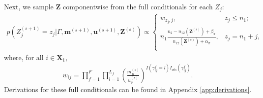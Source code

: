 \documentclass[ba]{imsart}
\begin{document}
Next, we sample $\bm{Z}$ componentwise from the full conditionals for each $Z_j$:
\begin{align}
\label{eqn:z_full_conditional}
p\left(Z_j^{(s+1)}  = z_j|\Gamma, \bm{m}^{(s+1)}, \bm{u}^{(s+1)}, \bm{Z^{(s)}}\right) \propto
\begin{cases} 
	w_{z_j, j},  & z_j \leq n_1; \\
	n_1 \frac{n_2 - n_{12}(\bm{Z}^{(s)}) + \beta_{\pi}}{n_{12}(\bm{Z}^{(s)}) + \alpha_{\pi}}, & z_j  = n_1 + j, \\
\end{cases}
\end{align}
where, for all $i \in \bm{X}_1$, 
\begin{align}
	\label{eqn:fs_weight}
	w_{ij} = \prod_{f=1}^{F}\prod_{l = 1}^{L_f} \left(\frac{m_{fl}^{(s)}}{u_{fl}^{(s)}}\right)^{I(\gamma_{ij}^f = l)I_{obs}(\gamma_{ij}^f)}.
\end{align}
Derivations for these full conditionals can be found in Appendix \ref{app:derivations}.

%



\end{document}
